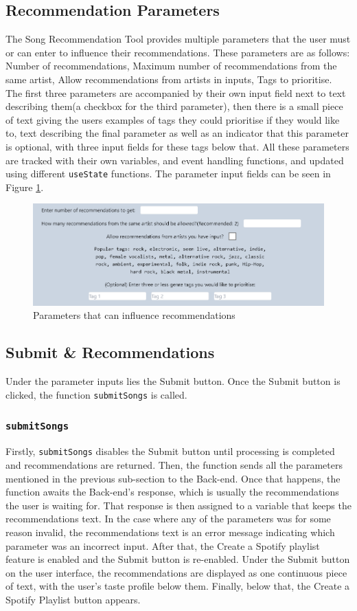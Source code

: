 \documentclass{l4proj}
\begin{document}
\subsection{Recommendation Parameters}
The Song Recommendation Tool provides multiple parameters that the user must or can enter to influence their recommendations. These parameters are as follows: Number of recommendations, Maximum number of recommendations from the same artist, Allow recommendations from artists in inputs, Tags to prioritise. The first three parameters are accompanied by their own input field next to text describing them(a checkbox for the third parameter), then there is a small piece of text giving the users examples of tags they could prioritise if they would like to, text describing the final parameter as well as an indicator that this parameter is optional, with three input fields for these tags below that. All these parameters are tracked with their own variables, and event handling functions, and updated using different \texttt{useState} functions. The parameter input fields can be seen in Figure \ref{fig:params}.
\begin{figure}
    \centering
    \includegraphics[width=1\linewidth]{images/params.png}
    \caption{Parameters that can influence recommendations}
    \label{fig:params}
\end{figure}
\subsection{Submit \& Recommendations}
Under the parameter inputs lies the Submit button. Once the Submit button is clicked, the function \texttt{submitSongs} is called.
\subsubsection{\texttt{submitSongs}}
Firstly, \texttt{submitSongs} disables the Submit button until processing is completed and recommendations are returned. Then, the function sends all the parameters mentioned in the previous sub-section to the Back-end. Once that happens, the function awaits the Back-end's response, which is usually the recommendations the user is waiting for. That response is then assigned to a variable that keeps the recommendations text. In the case where any of the parameters was for some reason invalid, the recommendations text is an error message indicating which parameter was an incorrect input. After that, the Create a Spotify playlist feature is enabled and the Submit button is re-enabled. Under the Submit button on the user interface, the recommendations are displayed as one continuous piece of text, with the user's taste profile below them. Finally, below that, the Create a Spotify Playlist button appears.
\end{document}
